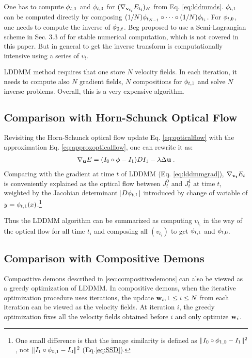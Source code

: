 \documentclass[letterpaper,12pt]{article}
\begin{document}
One has to compute $\phi_{t,1}$ and $\phi_{t,0}$ for $(\nabla_{\mathbf{v}_{t_i}} E_{t_i})_H$ from Eq. \ref{eq:lddmmds}. $\phi_{t,1}$ can be computed directly by composing $ (1/N)\phi_{t_{N-1}} \circ \cdots \circ (1/N) \phi_{t_{i}}$. For $\phi_{t,0}$, one needs to compute the inverse of $\phi_{0,t}$. Beg proposed to use a  Semi-Lagrangian scheme in Sec. 3.3 of \cite{Beg2005Computing} for stable numerical computation, which is not covered in this paper. But in general to get the inverse transform is computationally intensive using a series of $v_t$. 

LDDMM method requires that one store $N$ velocity fields. In each iteration, it needs to compute also $N$ gradient fields, $N$ compositions for $\phi_{t,1}$ and solve $N$ inverse problems. Overall, this is a very expensive algorithm.


\subsection{Comparison with Horn-Schunck Optical Flow}

Revisiting the Horn-Schunck optical flow update Eq. \ref{eq:opticalflow} with the approximation Eq. \ref{eq:approxopticalflow}, one can rewrite it as:
\begin{align}
\nabla_{\mathbf{u}}E = (I_0 \circ \phi - I_1) DI_1 - \lambda \Delta \mathbf{u} \;.
\end{align}
Comparing with the gradient at time $t$ of LDDMM (Eq. \ref{eq:lddmmgrad}), $\nabla_{\mathbf{v}_t} E_t$ is conveniently explained as the optical flow between $J_t^0$ and $J_t^1$ at time $t$, weighted by the Jacobian determinant $|D\phi_{t,1}|$ introduced by change of variable of $ y = \phi_{t,1}(x)$.\footnote{One small difference is that the image similarity is defined as $\|I_0 \circ \phi_{1,0} - I_1\|^2$, not $\|I_1 \circ \phi_{0,1} - I_0\|^2$ (Eq.\ref{eq:SSD}). } 

Thus the LDDMM algorithm can be summarized as computing $v_{t_i}$ in the way of the optical flow for all time $t_i$ and composing all $(v_{t_i})$ to get $\phi_{t, 1}$ and $\phi_{t, 0}$.


\subsection{Comparison with Compositive Demons}

Compositive demons described in \ref{sec:compositivedemons} can also be viewed as a greedy optimization of LDDMM. In compositive demons, when the iterative optimization procedure uses iterations, the update $\mathbf{w}_i, 1 \leq i \leq N$ from each iteration can be viewed as the velocity fields. At iteration $i$, the greedy optimization fixes all the velocity fields obtained before $i$ and only optimize $\mathbf{w}_i$. 
\end{document}
